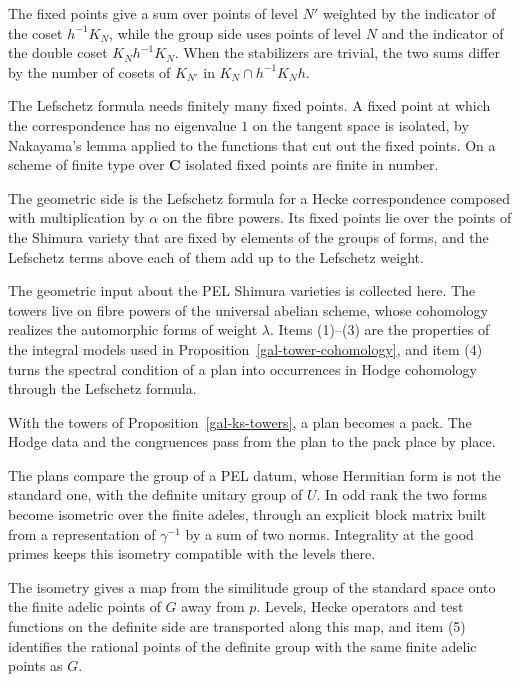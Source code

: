 The fixed points give a sum over points of level $N'$ weighted by the indicator of the coset
$h^{-1}K_N$, while the group side uses points of level $N$ and the indicator of the double coset
$K_Nh^{-1}K_N$. When the stabilizers are trivial, the two sums differ by the number of cosets of
$K_{N'}$ in $K_N\cap h^{-1}K_Nh$.

The Lefschetz formula needs finitely many fixed points. A fixed point at which the correspondence has
no eigenvalue $1$ on the tangent space is isolated, by Nakayama's lemma applied to the functions that
cut out the fixed points. On a scheme of finite type over $\mathbf C$ isolated fixed points are finite in
number.

The geometric side is the Lefschetz formula for a Hecke correspondence composed with multiplication by
$\alpha$ on the fibre powers. Its fixed points lie over the points of the Shimura variety that are fixed
by elements of the groups of forms, and the Lefschetz terms above each of them add up to the Lefschetz
weight.

The geometric input about the PEL Shimura varieties is collected here. The towers live on fibre powers
of the universal abelian scheme, whose cohomology realizes the automorphic forms of weight $\lambda$.
Items (1)--(3) are the properties of the integral models used in
Proposition~\ref{gal-tower-cohomology}, and item (4) turns the spectral condition of a plan into
occurrences in Hodge cohomology through the Lefschetz formula.

With the towers of Proposition~\ref{gal-ks-towers}, a plan becomes a pack. The Hodge data and the
congruences pass from the plan to the pack place by place.

The plans compare the group of a PEL datum, whose Hermitian form is not the standard one, with the
definite unitary group of $U$. In odd rank the two forms become isometric over the finite adeles, through
an explicit block matrix built from a representation of $\gamma^{-1}$ by a sum of two norms. Integrality
at the good primes keeps this isometry compatible with the levels there.

The isometry gives a map from the similitude group of the standard space onto the finite adelic points of
$G$ away from $p$. Levels, Hecke operators and test functions on the definite side are transported along
this map, and item (5) identifies the rational points of the definite group with the same finite adelic
points as $G$.

